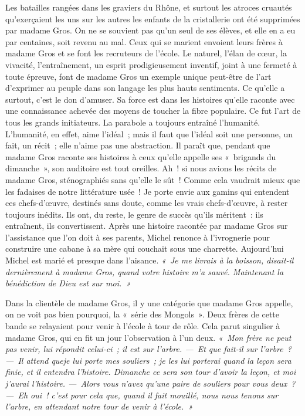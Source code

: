 \documentclass[french,twoside]{book} %
\newcommand\orgName[1]{#1}
\newcommand\persName[1]{#1}
\newcommand\placeName[1]{#1}
\begin{document}
Les batailles rangées dans les graviers du {\placeName Rhône}, et surtout les atroces cruautés qu’exerçaient les uns sur les autres les enfants de la cristallerie ont été supprimées par {\persName madame Gros}. On ne se souvient pas qu’un seul de ses élèves, et elle en a eu par centaines, soit revenu au mal. Ceux qui se marient envoient leurs frères à {\persName madame Gros} et se font les recruteurs de l’école. Le naturel, l’élan de cœur, la vivacité, l’entraînement, un esprit prodigieusement inventif, joint à une fermeté à toute épreuve, font de madame Gros un exemple unique peut-être de l’art d’exprimer au peuple dans son langage les plus hauts sentiments. Ce qu’elle a surtout, c’est le don d’amuser. Sa force est dans les histoires qu’elle raconte avec une connaissance achevée des moyens de toucher la fibre populaire. Ce fut l’art de tous les grands initiateurs. La parabole a toujours entraîné l’humanité. L’humanité, en effet, aime l’idéal ; mais il faut que l’idéal soit une personne, un fait, un récit ; elle n’aime pas une abstraction. Il paraît que, pendant que madame Gros raconte ses histoires à ceux qu’elle appelle ses « brigands du dimanche », son auditoire est tout oreilles. Ah ! si nous avions les récits de {\persName madame Gros}, sténographiés sans qu’elle le sût ! Comme cela vaudrait mieux que les fadaises de notre littérature usée ! Je porte envie aux gamins qui entendent ces chefs-d’œuvre, destinés sans doute, comme les vrais chefs-d’œuvre, à rester toujours inédits. Ils ont, du reste, le genre de succès qu’ils méritent : ils entraînent, ils convertissent. Après une histoire racontée par {\persName madame Gros} sur l’assistance que l’on doit à ses parents, {\persName Michel} renonce à l’ivrognerie pour construire une cabane à sa mère qui couchait sous une charrette. Aujourd’hui {\persName Michel} est marié et presque dans l’aisance. \emph{« Je me livrais à la boisson, disait-il dernièrement à {\persName madame Gros}, quand votre histoire m’a sauvé. Maintenant la bénédiction de Dieu est sur moi. »}\par
Dans la clientèle de {\persName madame Gros}, il y une catégorie que {\persName madame Gros} appelle, on ne voit pas bien pourquoi, la « série des {\orgName Mongols} ». Deux frères de cette bande se relayaient pour venir à l’école à tour de rôle. Cela parut singulier à {\persName madame Gros}, qui en fit un jour l’observation à l’un deux. \emph{« Mon frère ne peut pas venir, lui répondit celui-ci ; il est sur l’arbre. — Et que fait-il sur l’arbre ? — Il attend queje lui porte mes souliers ; je les lui porterai quand la leçon sera finie, et il entendra l’histoire. Dimanche ce sera son tour d’avoir la leçon, et moi j’aurai l’histoire. — Alors vous n’avez qu’une paire de souliers pour vous deux ? — Eh oui ! c’est pour cela que, quand il fait mouillé, nous nous tenons sur l’arbre, en attendant notre tour de venir à l’école. »}\par
\end{document}

